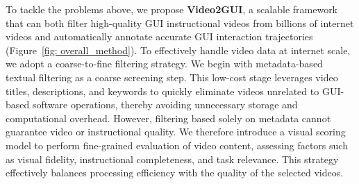 \documentclass{llmxive}
\begin{document}
To tackle the problems above, we propose \textbf{Video2GUI}, a scalable framework that can both filter high-quality GUI instructional videos from billions of internet videos and automatically annotate accurate GUI interaction trajectories (Figure~\ref{fig: overall_method}).
To effectively handle video data at internet scale, we adopt a coarse-to-fine filtering strategy. We begin with metadata-based textual filtering as a coarse screening step. This low-cost stage leverages video titles, descriptions, and keywords to quickly eliminate videos unrelated to GUI-based software operations, thereby avoiding unnecessary storage and computational overhead. However, filtering based solely on metadata cannot guarantee video or instructional quality. We therefore introduce a visual scoring model to perform fine-grained evaluation of video content, assessing factors such as visual fidelity, instructional completeness, and task relevance. This strategy effectively balances processing efficiency with the quality of the selected videos.
\end{document}
